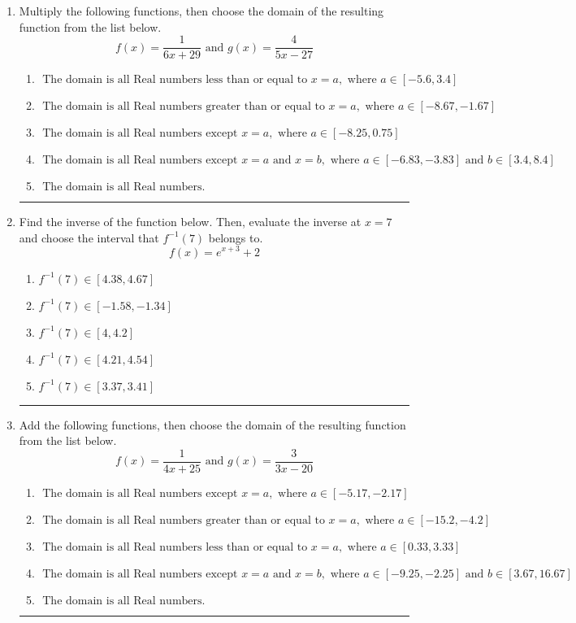 \documentclass[14pt]{extbook}
\newcommand{\litem}[1]{\item#1\hspace*{-1cm}\rule{\textwidth}{0.4pt}}
\begin{document}
\begin{enumerate}
{\begin{enumerate}[label=\Alph*.]
\end{enumerate} }
\litem{
Multiply the following functions, then choose the domain of the resulting function from the list below.\[ f(x) = \frac{1}{6x+29} \text{ and } g(x) = \frac{4}{5x-27} \]\begin{enumerate}[label=\Alph*.]
\item \( \text{ The domain is all Real numbers less than or equal to } x = a, \text{ where } a \in [-5.6, 3.4] \)
\item \( \text{ The domain is all Real numbers greater than or equal to } x = a, \text{ where } a \in [-8.67, -1.67] \)
\item \( \text{ The domain is all Real numbers except } x = a, \text{ where } a \in [-8.25, 0.75] \)
\item \( \text{ The domain is all Real numbers except } x = a \text{ and } x = b, \text{ where } a \in [-6.83, -3.83] \text{ and } b \in [3.4, 8.4] \)
\item \( \text{ The domain is all Real numbers. } \)

\end{enumerate} }
\litem{
Find the inverse of the function below. Then, evaluate the inverse at $x = 7$ and choose the interval that $f^{-1}(7)$ belongs to.\[ f(x) = e^{x+3}+2 \]\begin{enumerate}[label=\Alph*.]
\item \( f^{-1}(7) \in [4.38, 4.67] \)
\item \( f^{-1}(7) \in [-1.58, -1.34] \)
\item \( f^{-1}(7) \in [4, 4.2] \)
\item \( f^{-1}(7) \in [4.21, 4.54] \)
\item \( f^{-1}(7) \in [3.37, 3.41] \)

\end{enumerate} }
\litem{
Add the following functions, then choose the domain of the resulting function from the list below.\[ f(x) = \frac{1}{4x+25} \text{ and } g(x) = \frac{3}{3x-20} \]\begin{enumerate}[label=\Alph*.]
\item \( \text{ The domain is all Real numbers except } x = a, \text{ where } a \in [-5.17, -2.17] \)
\item \( \text{ The domain is all Real numbers greater than or equal to } x = a, \text{ where } a \in [-15.2, -4.2] \)
\item \( \text{ The domain is all Real numbers less than or equal to } x = a, \text{ where } a \in [0.33, 3.33] \)
\item \( \text{ The domain is all Real numbers except } x = a \text{ and } x = b, \text{ where } a \in [-9.25, -2.25] \text{ and } b \in [3.67, 16.67] \)
\item \( \text{ The domain is all Real numbers. } \)


\end{enumerate}}
\end{enumerate}
\end{document}
